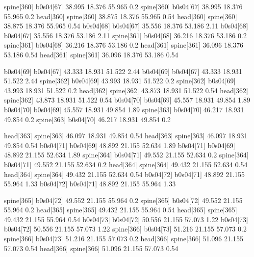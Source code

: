 spine[360]    b0s04[67]    38.995    18.376    55.965    0.2
spine[360]    b0s04[67]    38.995    18.376    55.965    0.2
head[360]    spine[360]    38.875    18.376    55.965    0.54
head[360]    spine[360]    38.875    18.376    55.965    0.54
b0s04[68]    b0s04[67]    35.556    18.376    53.186    2.11
b0s04[68]    b0s04[67]    35.556    18.376    53.186    2.11
spine[361]    b0s04[68]    36.216    18.376    53.186    0.2
spine[361]    b0s04[68]    36.216    18.376    53.186    0.2
head[361]    spine[361]    36.096    18.376    53.186    0.54
head[361]    spine[361]    36.096    18.376    53.186    0.54


b0s04[69]    b0s04[67]    43.333    18.931    51.522    2.44
b0s04[69]    b0s04[67]    43.333    18.931    51.522    2.44
spine[362]    b0s04[69]    43.993    18.931    51.522    0.2
spine[362]    b0s04[69]    43.993    18.931    51.522    0.2
head[362]    spine[362]    43.873    18.931    51.522    0.54
head[362]    spine[362]    43.873    18.931    51.522    0.54
b0s04[70]    b0s04[69]    45.557    18.931    49.854    1.89
b0s04[70]    b0s04[69]    45.557    18.931    49.854    1.89
spine[363]    b0s04[70]    46.217    18.931    49.854    0.2
spine[363]    b0s04[70]    46.217    18.931    49.854    0.2


head[363]    spine[363]    46.097    18.931    49.854    0.54
head[363]    spine[363]    46.097    18.931    49.854    0.54
b0s04[71]    b0s04[69]    48.892    21.155    52.634    1.89
b0s04[71]    b0s04[69]    48.892    21.155    52.634    1.89
spine[364]    b0s04[71]    49.552    21.155    52.634    0.2
spine[364]    b0s04[71]    49.552    21.155    52.634    0.2
head[364]    spine[364]    49.432    21.155    52.634    0.54
head[364]    spine[364]    49.432    21.155    52.634    0.54
b0s04[72]    b0s04[71]    48.892    21.155    55.964    1.33
b0s04[72]    b0s04[71]    48.892    21.155    55.964    1.33


spine[365]    b0s04[72]    49.552    21.155    55.964    0.2
spine[365]    b0s04[72]    49.552    21.155    55.964    0.2
head[365]    spine[365]    49.432    21.155    55.964    0.54
head[365]    spine[365]    49.432    21.155    55.964    0.54
b0s04[73]    b0s04[72]    50.556    21.155    57.073    1.22
b0s04[73]    b0s04[72]    50.556    21.155    57.073    1.22
spine[366]    b0s04[73]    51.216    21.155    57.073    0.2
spine[366]    b0s04[73]    51.216    21.155    57.073    0.2
head[366]    spine[366]    51.096    21.155    57.073    0.54
head[366]    spine[366]    51.096    21.155    57.073    0.54


